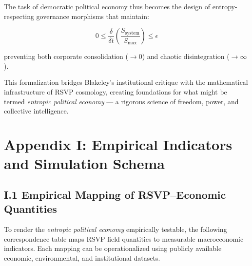 \documentclass[11pt,a4paper,titlepage]{article}
\theoremstyle{definition}
\begin{document}
\begin{itemize}
The task of democratic political economy thus becomes the design of entropy-respecting governance morphisms that maintain:

\begin{equation}
0\leq \frac{\delta}{\delta t}\left(\frac{S_{\text{system}}}{S_{\text{max}}}\right) \leq \epsilon
\label{eq:governance_condition}
\end{equation}

preventing both corporate consolidation ($\rightarrow 0$) and chaotic disintegration ($\rightarrow \infty$).

This formalization bridges Blakeley's institutional critique with the mathematical infrastructure of RSVP cosmology, creating foundations for what might be termed \emph{entropic political economy} — a rigorous science of freedom, power, and collective intelligence.

\section*{Appendix I: Empirical Indicators and Simulation Schema}
\label{app:empirical_simulation_political}

\subsection*{I.1 Empirical Mapping of RSVP–Economic Quantities}

To render the \emph{entropic political economy} empirically testable, the following correspondence table maps RSVP field quantities to measurable macroeconomic indicators.  
Each mapping can be operationalized using publicly available economic, environmental, and institutional datasets.


\end{itemize}
\end{document}
